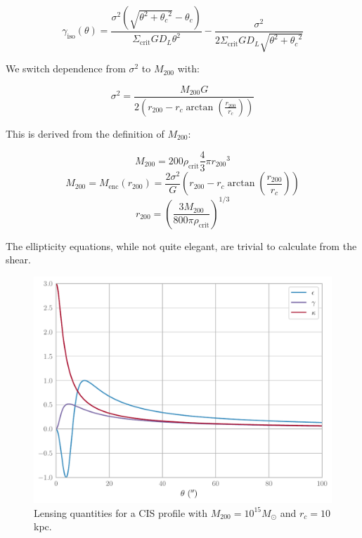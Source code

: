 \documentclass[10pt]{article}
\begin{document}
\begin{equation}
\gamma_\mathrm{iso}(\theta) = \frac{\sigma^2 \left(\sqrt{\theta^2 + {\theta_c}^2} - \theta_c \right)}{\Sigma_\mathrm{crit} G D_L \theta^2} - \frac{\sigma^2}{2 \Sigma_\mathrm{crit} G D_L \sqrt{\theta^2 + {\theta_c}^2}}
\end{equation}

We switch dependence from $\sigma^2$ to $M_{200}$ with:

\begin{equation}
\sigma^2 = \frac{M_{200} G}{2 \left( r_{200} - r_c \arctan{\left(\frac{r_{200}}{r_c}\right)} \right)}
\end{equation}

This is derived from the definition of $M_{200}$:

\begin{equation}
M_{200} = 200 \rho_\mathrm{crit} \frac{4}{3} \pi {r_{200}}^3
\end{equation}
\begin{equation}
M_{200} = M_\mathrm{enc}(r_{200}) = \frac{2 \sigma^2}{G} \left( r_{200} - r_c \arctan{\left(\frac{r_{200}}{r_c}\right)} \right)
\end{equation}
\begin{equation}
r_{200} = \left( \frac{3 M_{200}}{800 \pi \rho_\mathrm{crit}} \right)^{1/3}
\end{equation}

The ellipticity equations, while not quite elegant, are trivial to calculate from the shear.

\begin{figure}
    \includegraphics{isothermalproperties.pdf}
    \caption{Lensing quantities for a CIS profile with $M_{200} = 10^{15} M_\odot$ and $r_c = 10$ kpc.}
    \label{}
\end{figure}
\end{document}
